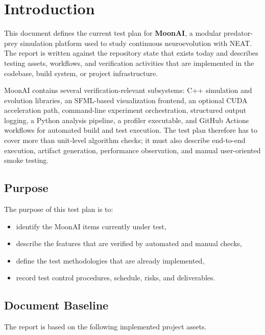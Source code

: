 \section{Introduction}
\label{sec:intro}

This document defines the current test plan for \textbf{MoonAI}, a modular predator-prey
simulation platform used to study continuous neuroevolution with NEAT. The report is
written against the repository state that exists today and describes 
testing assets, workflows, and verification activities that are implemented in the
codebase, build system, or project infrastructure.

MoonAI contains several verification-relevant subsystems: C++ simulation and evolution
libraries, an SFML-based visualization frontend, an optional CUDA acceleration path,
command-line experiment orchestration, structured output logging, a Python analysis
pipeline, a profiler executable, and GitHub Actions workflows for automated build and test
execution. The test plan therefore has to cover more than unit-level algorithm checks; it
must also describe end-to-end execution, artifact generation, performance observation, and
manual user-oriented smoke testing.

\subsection{Purpose}

The purpose of this test plan is to:

\begin{itemize}[nosep]
	\item identify the MoonAI items currently under test,
	\item describe the features that are verified by automated and manual checks,
	\item define the test methodologies that are already implemented,
	\item record test control procedures, schedule, risks, and deliverables.
\end{itemize}

\subsection{Document Baseline}

The report is based on the following implemented project assets.

